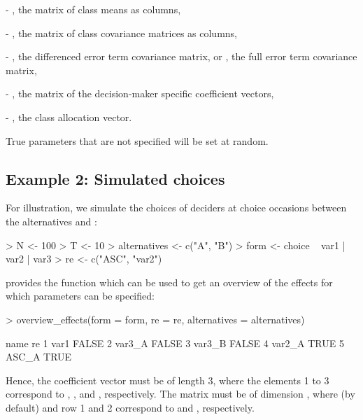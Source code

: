 \documentclass[article]{jss}
\newcommand{\fct}[1]{\code{#1()}}
\begin{document}
- , the matrix of class means as columns,

- , the matrix of class covariance matrices as columns,

- , the differenced error term covariance matrix, or , the full error term covariance matrix,

- , the matrix of the decision-maker specific coefficient vectors,

- , the class allocation vector.

True parameters that are not specified will be set at random.

\subsection{Example 2: Simulated choices} \label{subsec:example_simulated_choices}

For illustration, we simulate the choices of  deciders at  choice occasions between the alternatives  and :

\begin{Schunk}
\begin{Sinput}
> N <- 100
> T <- 10
> alternatives <- c("A", "B")
> form <- choice ~ var1 | var2 | var3
> re <- c("ASC", "var2")
\end{Sinput}
\end{Schunk}

 provides the function \fct{overview\_effects} which can be used to get an overview of the effects for which parameters can be specified:

\begin{Schunk}
\begin{Sinput}
> overview_effects(form = form, re = re, alternatives = alternatives)
\end{Sinput}
\begin{Soutput}
    name    re
1   var1 FALSE
2 var3_A FALSE
3 var3_B FALSE
4 var2_A  TRUE
5  ASC_A  TRUE
\end{Soutput}
\end{Schunk}

Hence, the coefficient vector  must be of length 3, where the elements 1 to 3 correspond to , , and , respectively. The matrix  must be of dimension , where (by default)  and row 1 and 2 correspond to  and , respectively.
\end{document}
